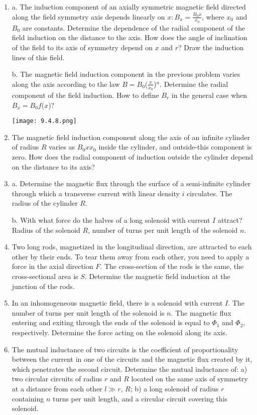 \documentclass{article}
\begin{document}
\begin{enumerate}[label=9.4.\arabic*]
\item a. The induction component of an axially symmetric magnetic field directed along the field symmetry axis depends linearly on $x: B_x = \frac{B_0 x}{x_0}$, where $x_0$ and $B_0$ are constants. Determine the dependence of the radial component of the field induction on the distance to the axis. How does the angle of inclination of the field to its axis of symmetry depend on $x$ and $r$? Draw the induction lines of this field.

b. The magnetic field induction component in the previous problem varies along the axis according to the law $B = B_0$($\frac{x}{x_0}$)$^n$. Determine the radial component of the field induction. How to define $B_r$ in the general case when $B_x = B_0 f$($x$)?

\begin{center}
    \texttt{[image: 9.4.8.png]}
\end{center}

\item The magnetic field induction component along the axis of an infinite cylinder of radius $R$ varies as ${B_0 x}{x_0}$ inside the cylinder, and outside-this component is zero. How does the radial component of induction outside the cylinder depend on the distance to its axis?

\item a. Determine the magnetic flux through the surface of a semi-infinite cylinder through which a transverse current with linear density $i$ circulates. The radius of the cylinder $R$.

b. With what force do the halves of a long solenoid with current $I$ attract? Radius of the solenoid $R$, number of turns per unit length of the solenoid $n$.

\item Two long rods, magnetized in the longitudinal direction, are attracted to each other by their ends. To tear them away from each other, you need to apply a force in the axial direction $F$. The cross-section of the rods is the same, the cross-sectional area is $S$. Determine the magnetic field induction at the junction of the rods.

\item In an inhomogeneous magnetic field, there is a solenoid with current $I$. The number of turns per unit length of the solenoid is $n$. The magnetic flux entering and exiting through the ends of the solenoid is equal to $\Phi_1$ and $\Phi_2$, respectively. Determine the force acting on the solenoid along its axis.

\item The mutual inductance of two circuits is the coefficient of proportionality between the current in one of the circuits and the magnetic flux created by it, which penetrates the second circuit. Determine the mutual inductance of: a) two circular circuits of radius $r$ and $R$ located on the same axis of symmetry at a distance from each other $l \gg r$, $R$; b) a long solenoid of radius $r$ containing $n$ turns per unit length, and a circular circuit covering this solenoid.


\end{enumerate}
\end{document}
